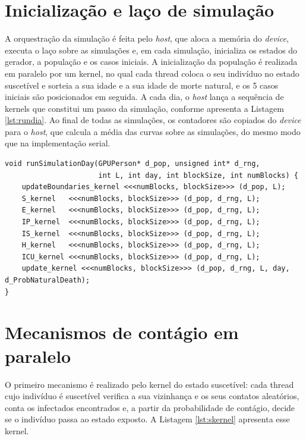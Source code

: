 \section{Inicialização e laço de simulação}

A orquestração da simulação é feita pelo \textit{host}, que aloca a memória do \textit{device}, executa o laço sobre as simulações e, em cada simulação, inicializa os estados do gerador, a população e os casos iniciais. A inicialização da população é realizada em paralelo por um kernel, no qual cada thread coloca o seu indivíduo no estado suscetível e sorteia a sua idade e a sua idade de morte natural, e os 5 casos iniciais são posicionados em seguida. A cada dia, o \textit{host} lança a sequência de kernels que constitui um passo da simulação, conforme apresenta a Listagem \ref{lst:rundia}. Ao final de todas as simulações, os contadores são copiados do \textit{device} para o \textit{host}, que calcula a média das curvas sobre as simulações, do mesmo modo que na implementação serial.

\begin{lstlisting}[caption={Sequência de kernels lançada a cada dia.}, label={lst:rundia}]
void runSimulationDay(GPUPerson* d_pop, unsigned int* d_rng,
                      int L, int day, int blockSize, int numBlocks) {
    updateBoundaries_kernel <<<numBlocks, blockSize>>> (d_pop, L);
    S_kernel   <<<numBlocks, blockSize>>> (d_pop, d_rng, L);
    E_kernel   <<<numBlocks, blockSize>>> (d_pop, d_rng, L);
    IP_kernel  <<<numBlocks, blockSize>>> (d_pop, d_rng, L);
    IS_kernel  <<<numBlocks, blockSize>>> (d_pop, d_rng, L);
    H_kernel   <<<numBlocks, blockSize>>> (d_pop, d_rng, L);
    ICU_kernel <<<numBlocks, blockSize>>> (d_pop, d_rng, L);
    update_kernel <<<numBlocks, blockSize>>> (d_pop, d_rng, L, day, d_ProbNaturalDeath);
}
\end{lstlisting}

\section{Mecanismos de contágio em paralelo}

O primeiro mecanismo é realizado pelo kernel do estado suscetível: cada thread cujo indivíduo é suscetível verifica a sua vizinhança e os seus contatos aleatórios, conta os infectados encontrados e, a partir da probabilidade de contágio, decide se o indivíduo passa ao estado exposto. A Listagem \ref{lst:skernel} apresenta esse kernel.

